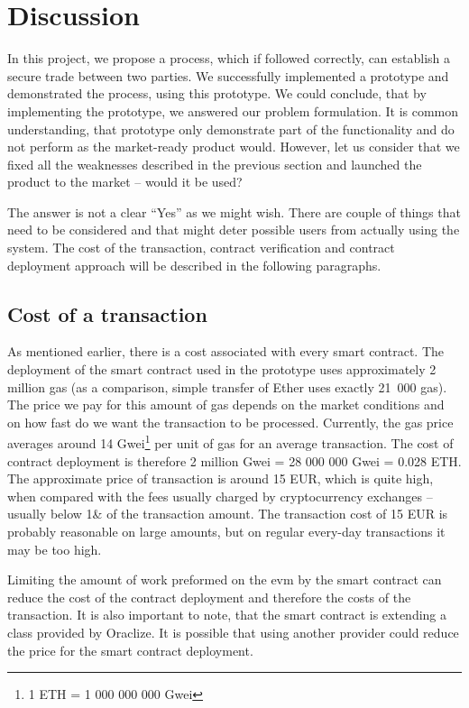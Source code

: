 \section{Discussion}\label{sec:discussion}

In this project, we propose a process, which if followed correctly, can establish a secure trade between two parties. We successfully implemented a prototype and demonstrated the process, using this prototype. We could conclude, that by implementing the prototype, we answered our problem formulation. It is common understanding, that prototype only demonstrate part of the functionality and do not perform as the market-ready product would. However, let us consider that we fixed all the weaknesses described in the previous section and launched the product to the market -- would it be used?

The answer is not a clear ``Yes'' as we might wish. There are couple of things that need to be considered and that might deter possible users from actually using the system. The cost of the transaction, contract verification and contract deployment approach will be described in the following paragraphs.

\subsection{Cost of a transaction}
As mentioned earlier, there is a cost associated with every smart contract. The deployment of the smart contract used in the prototype uses approximately 2 million gas (as a comparison, simple transfer of Ether uses exactly 21~000 gas). The price we pay for this amount of gas depends on the market conditions and on how fast do we want the transaction to be processed. Currently, the gas price averages around 14 Gwei\footnote{1 ETH = 1 000 000 000 Gwei} per unit of gas for an average transaction\footnotemark. The cost of contract deployment is therefore 2 million  Gwei = 28 000 000 Gwei = 0.028 ETH. The approximate price of transaction is around 15 EUR, which is quite high, when compared with the fees usually charged by cryptocurrency exchanges -- usually below 1\& of the transaction amount. The transaction cost of 15 EUR is probably reasonable on large amounts, but on regular every-day transactions it may be too high.
% 

Limiting the amount of work preformed on the \acrshort{evm} by the smart contract can reduce the cost of the contract deployment and therefore the costs of the transaction. It is also important to note, that the smart contract is extending a class provided by Oraclize. It is possible that using another provider could reduce the price for the smart contract deployment.

